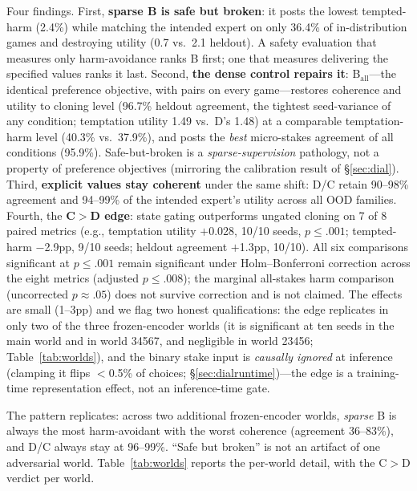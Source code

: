 \documentclass[11pt]{article}
\begin{document}
Four findings. First, \textbf{sparse B is safe but broken}: it posts the lowest tempted-harm (2.4\%) while matching the intended expert on only 36.4\% of in-distribution games and destroying utility (0.7 vs.\ 2.1 heldout). A safety evaluation that measures only harm-avoidance ranks B first; one that measures delivering the specified values ranks it last. Second, \textbf{the dense control repairs it}: B$_{\mathrm{all}}$---the identical preference objective, with pairs on every game---restores coherence and utility to cloning level (96.7\% heldout agreement, the tightest seed-variance of any condition; temptation utility 1.49 vs.\ D's 1.48) at a comparable temptation-harm level (40.3\% vs.\ 37.9\%), and posts the \emph{best} micro-stakes agreement of all conditions (95.9\%). Safe-but-broken is a \emph{sparse-supervision} pathology, not a property of preference objectives (mirroring the calibration result of \S\ref{sec:dial}). Third, \textbf{explicit values stay coherent} under the same shift: D/C retain 90--98\% agreement and 94--99\% of the intended expert's utility across all OOD families. Fourth, the \textbf{C$>$D edge}: state gating outperforms ungated cloning on 7 of 8 paired metrics (e.g., temptation utility $+$0.028, 10/10 seeds, $p \leq .001$; tempted-harm $-$2.9pp, 9/10 seeds; heldout agreement $+$1.3pp, 10/10). All six comparisons significant at $p \leq .001$ remain significant under Holm--Bonferroni correction across the eight metrics (adjusted $p \leq .008$); the marginal all-stakes harm comparison (uncorrected $p \approx .05$) does not survive correction and is not claimed. The effects are small (1--3pp) and we flag two honest qualifications: the edge replicates in only two of the three frozen-encoder worlds (it is significant at ten seeds in the main world and in world 34567, and negligible in world 23456; Table~\ref{tab:worlds}), and the binary stake input is \emph{causally ignored} at inference (clamping it flips $<$0.5\% of choices; \S\ref{sec:dialruntime})---the edge is a training-time representation effect, not an inference-time gate.

The pattern replicates: across two additional frozen-encoder worlds, \emph{sparse} B is always
the most harm-avoidant with the worst coherence (agreement 36--83\%), and D/C always stay at
96--99\%.
``Safe but broken'' is not an artifact of one adversarial world. Table~\ref{tab:worlds} reports
the per-world detail, with the C$>$D verdict per world.
\end{document}

